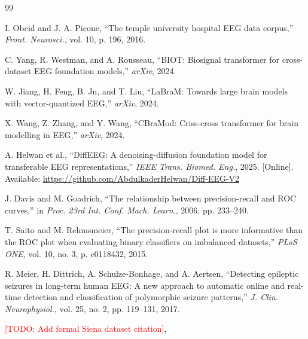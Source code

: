 \documentclass[journal]{IEEEtran}
\newcommand{\TODO}[1]{\textcolor{red}{[TODO: #1]}}
\begin{document}
\begin{thebibliography}{99}

I. Obeid and J. A. Picone, ``The temple university hospital EEG data corpus,'' \textit{Front. Neurosci.}, vol. 10, p. 196, 2016.

C. Yang, R. Westman, and A. Rousseau, ``BIOT: Biosignal transformer for cross-dataset EEG foundation models,'' \textit{arXiv}, 2024.

W. Jiang, H. Feng, B. Ju, and T. Liu, ``LaBraM: Towards large brain models with vector-quantized EEG,'' \textit{arXiv}, 2024.

X. Wang, Z. Zhang, and Y. Wang, ``CBraMod: Criss-cross transformer for brain modelling in EEG,'' \textit{arXiv}, 2024.

A. Helwan et al., ``DiffEEG: A denoising-diffusion foundation model for transferable EEG representations,'' \textit{IEEE Trans. Biomed. Eng.}, 2025. [Online]. Available: \url{https://github.com/AbdulkaderHelwan/Diff-EEG-V2}

J. Davis and M. Goadrich, ``The relationship between precision-recall and ROC curves,'' in \textit{Proc. 23rd Int. Conf. Mach. Learn.}, 2006, pp. 233--240.

T. Saito and M. Rehmsmeier, ``The precision-recall plot is more informative than the ROC plot when evaluating binary classifiers on imbalanced datasets,'' \textit{PLoS ONE}, vol. 10, no. 3, p. e0118432, 2015.

R. Meier, H. Dittrich, A. Schulze-Bonhage, and A. Aertsen, ``Detecting epileptic seizures in long-term human EEG: A new approach to automatic online and real-time detection and classification of polymorphic seizure patterns,'' \textit{J. Clin. Neurophysiol.}, vol. 25, no. 2, pp. 119--131, 2017.

\TODO{Add formal Siena dataset citation},

\end{thebibliography}
\end{document}
